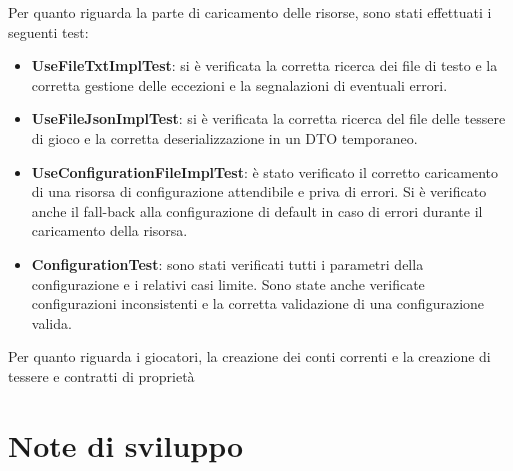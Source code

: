 Per quanto riguarda la parte di caricamento delle risorse, sono stati effettuati i seguenti test:\newline
\begin{itemize}
    \item \textbf{UseFileTxtImplTest}: si è verificata la corretta ricerca dei file di testo e la corretta gestione delle eccezioni e la segnalazioni di eventuali errori.
    \item \textbf{UseFileJsonImplTest}: si è verificata la corretta ricerca del file delle tessere di gioco e la corretta deserializzazione in un DTO temporaneo.
    \item \textbf{UseConfigurationFileImplTest}: è stato verificato il corretto caricamento di una risorsa di configurazione attendibile e priva di errori. Si è verificato anche il fall-back alla configurazione di default in caso di errori durante il caricamento della risorsa.
    \item \textbf{ConfigurationTest}: sono stati verificati tutti i parametri della configurazione e i relativi casi limite. Sono state anche verificate configurazioni inconsistenti e la corretta validazione di una configurazione valida.
\end{itemize}
Per quanto riguarda i giocatori, la creazione dei conti correnti e la creazione di tessere e contratti di proprietà
\section{Note di sviluppo}